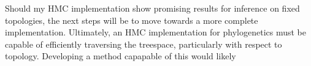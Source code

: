 \documentclass{article}
\begin{document}
    Should my \ac{HMC} implementation show promising results for inference on
        fixed topologies, the next steps will be to move towards a more
        complete implementation.
    Ultimately, an \ac{HMC} implementation for phylogenetics must be capable of
        efficiently traversing the treespace, particularly with respect to
        topology.
    Developing a method capapable of this would likely

    \printbibliography
\end{document}
